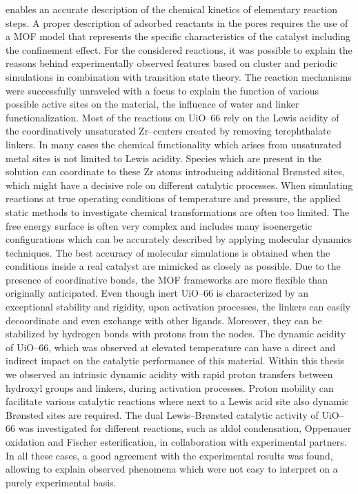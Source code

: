 enables an accurate description of the chemical kinetics of elementary reaction
steps. A proper description of adsorbed reactants in the pores requires the use
of a MOF model that represents the specific characteristics of the catalyst
including the confinement effect. For the considered reactions, it was possible
to explain the reasons behind experimentally observed features based on cluster
and periodic simulations in combination with transition state theory. The
reaction mechanisms were successfully unraveled with a focus to explain the function of various possible active sites on the material, the influence of water and linker functionalization. Most of the reactions on UiO--66 rely on the Lewis acidity of the coordinatively unsaturated Zr--centers created by removing terephthalate linkers. In many cases the chemical functionality which arises from unsaturated metal sites is not limited to Lewis acidity. Species which are present in the solution can coordinate to these Zr atoms introducing additional Br\o{}nsted sites, which might have a decisive role on different catalytic processes.
\npar
When simulating reactions at true operating conditions of temperature and pressure, the applied static methods to investigate chemical transformations are often too limited. The free energy surface is often very complex and includes many isoenergetic configurations which can be accurately described by applying molecular dynamics techniques. The best accuracy of molecular simulations is obtained when the conditions inside a real catalyst are mimicked as closely as possible. 
\npar
Due to the presence of coordinative bonds, the MOF frameworks are more flexible
than originally anticipated. Even though inert UiO--66 is characterized by an
exceptional stability and rigidity, upon activation processes, the linkers can
easily decoordinate and even exchange with other ligands. Moreover, they can be
stabilized by hydrogen bonds with protons from the nodes. The dynamic acidity of
UiO--66, which was observed at elevated temperature can have a direct and
indirect impact on the catalytic performance of this material. Within this thesis we observed an intrinsic dynamic acidity with rapid proton transfers between hydroxyl groups and linkers, during activation processes. Proton mobility can facilitate various catalytic reactions where next to a Lewis acid site also dynamic Br\o{}nsted sites are required.
The dual Lewis--Br\o{}nsted catalytic activity of UiO--66 was investigated for
different reactions, such as aldol condensation,
Oppenauer oxidation and Fischer esterification, in collaboration with experimental partners. In all these cases, a good agreement with the experimental results was found, allowing to explain observed phenomena which were not easy to interpret on a purely experimental basis.
